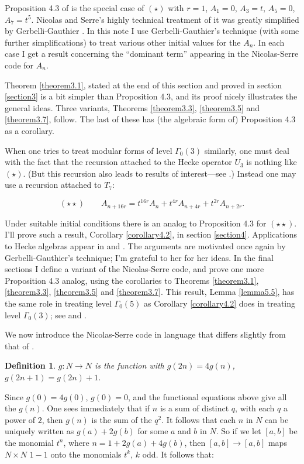 \documentclass{monsky2009}
\newtheorem{definition}{Definition}[section]
\begin{document}
Proposition 4.3 of \cite{6} is the special case of $(\star)$ with $r=1$, $A_{1}=0$, $A_{3}=t$, $A_{5}=0$, $A_{7}=t^{5}$. Nicolas and Serre's highly technical treatment of it was greatly simplified by Gerbelli-Gauthier \cite{1}.  In this note I use Gerbelli-Gauthier's technique (with some further simplifications) to treat various other initial values for the $A_{n}$. In each case I get a result concerning the ``dominant term'' appearing in the Nicolas-Serre code for $A_{n}$.

Theorem \ref{theorem3.1}, stated at the end of this section and proved in section \ref{section3} is a bit simpler than Proposition 4.3, and its proof nicely illustrates the general ideas. Three variants, Theorems \ref{theorem3.3}, \ref{theorem3.5} and \ref{theorem3.7}, follow. The last of these has (the algebraic form of) Proposition 4.3 as a corollary.

When one tries to treat modular forms of level $\Gamma_{0}(3)$ similarly, one must deal with the fact that the recursion attached to the Hecke operator $U_{3}$ is nothing like $(\star)$. (But this recursion also leads to results of interest---see \cite{3}.) Instead one may use a recursion attached to $T_{7}$:

\[
(\star\star)\qquad
A_{n+16r} = t^{16r}A_{n}+t^{4r}A_{n+4r}+t^{2r}A_{n+2r}.
\]

Under suitable initial conditions there is an analog to Proposition 4.3 for $(\star\star)$. I'll prove such a result, Corollary \ref{corollary4.2}, in section \ref{section4}. Applications to Hecke algebras appear in \cite{2} and \cite{3}. The arguments are motivated once again by Gerbelli-Gauthier's technique; I'm grateful to her for her ideas. In the final sections I define a variant of the Nicolas-Serre code, and prove one more Proposition 4.3 analog, using the corollaries to Theorems \ref{theorem3.1}, \ref{theorem3.3}, \ref{theorem3.5} and \ref{theorem3.7}. This result, Lemma \ref{lemma5.5}, has the same role in treating level $\Gamma_{0}(5)$ as Corollary \ref{corollary4.2} does in treating level $\Gamma_{0}(3)$; see \cite{4} and \cite{5}.

We now introduce the Nicolas-Serre code in language that differs slightly from that of \cite{6}.

\begin{definition}
\label{def1.2}
$g:N\rightarrow N$ is the function with $g(2n)=4g(n)$, $g(2n+1)=g(2n)+1$.
\end{definition}

Since $g(0)=4g(0)$, $g(0)=0$, and the functional equations above give all the $g(n)$. One sees immediately that if $n$ is a sum of distinct $q$, with each $q$ a power of $2$, then $g(n)$ is the sum of the $q^{2}$. It follows that each $n$ in $N$ can be uniquely written as $g(a)+2g(b)$ for some $a$ and $b$ in $N$. So if we let $[a,b]$ be the monomial $t^{n}$, where $n=1+2g(a)+4g(b)$, then $[a,b]\rightarrow [a,b]$ maps $N\times N$ $1-1$ onto the monomials $t^{k}$, $k$ odd. It follows that:
\end{document}
